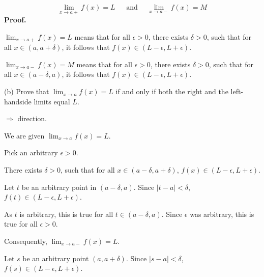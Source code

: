 \documentclass[10pt]{article}
\begin{document}
\begin{equation*}
\lim _{x\rightarrow a+} f( x) =L\ \quad \text{ and } \quad \lim _{x\rightarrow a-} f( x) =M
\end{equation*}
\textbf{Proof.}



$\displaystyle \lim _{x\rightarrow a+} f( x) =L$ means that for all $\displaystyle \epsilon  >0$, there exists $\displaystyle \delta  >0$, such that for all $\displaystyle x\in ( a,a+\delta )$, it follows that $\displaystyle f( x) \in ( L-\epsilon ,L+\epsilon )$.



$\displaystyle \lim _{x\rightarrow a-} f( x) =M$ means that for all $\displaystyle \epsilon  >0$, there exists $\displaystyle \delta  >0$, such that for all $\displaystyle x\in ( a-\delta ,a)$, it follows that $\displaystyle f( x) \in ( L-\epsilon ,L+\epsilon )$.



(b) Prove that $\displaystyle \lim _{x\rightarrow a} f( x) =L$ if and only if both the right and the left-handside limits equal $\displaystyle L$.



$\displaystyle \Longrightarrow $ direction. 



We are given $\displaystyle \lim _{x\rightarrow a} f( x) =L$. 



Pick an arbitrary $\displaystyle \epsilon  >0$. 



There exists $\displaystyle \delta  >0$, such that for all $\displaystyle x\in ( a-\delta ,a+\delta )$, $\displaystyle f( x) \in ( L-\epsilon ,L+\epsilon )$.



Let $\displaystyle t$ be an arbitrary point in $\displaystyle ( a-\delta ,a)$. Since $\displaystyle |t-a|< \delta $, $\displaystyle f( t) \in ( L-\epsilon ,L+\epsilon )$.



As $\displaystyle t$ is arbitrary, this is true for all $\displaystyle t\in ( a−\delta ,a)$. Since $\displaystyle \epsilon $ was arbitrary, this is true for all $\displaystyle \epsilon  >0$.



Consequently, $\displaystyle \lim _{x\rightarrow a-} f( x) =L$.



Let $\displaystyle s$ be an arbitrary point $\displaystyle ( a,a+\delta )$. Since $\displaystyle |s-a|< \delta $, $\displaystyle f( s) \in ( L-\epsilon ,L+\epsilon )$.
\end{document}
